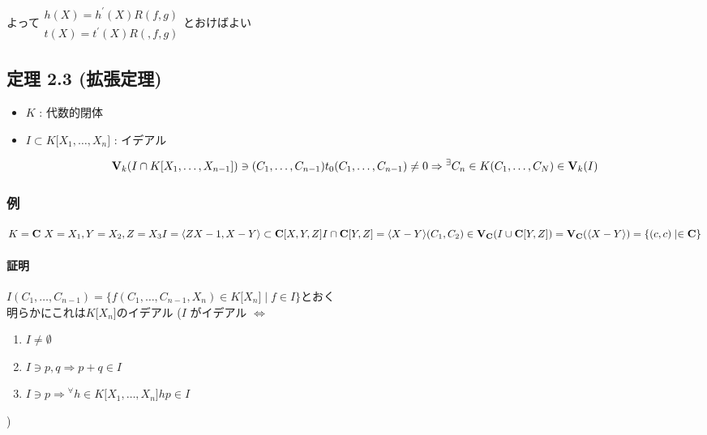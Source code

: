 \documentclass[12pt,a4paper]{article}
\begin{document}
  よって$ \begin{array}{l}h(X) = h^\prime (X) R(f, g) \\ t(X) = t^\prime (X) R(,f, g) \end{array}$とおけばよい

\subsection*{定理 2.3 (拡張定理)}
  \begin{itemize}
    \item $K$ : 代数的閉体
    \item $ I \subset{} K \lbrack{} X_1, \ldots, X_n \rbrack{} $ : イデアル
  \end{itemize}
  \[ \mathbf{V}_k (I \cap K \lbrack X_1, \ldots, X_{n-1} \rbrack ) \ni ( C_1, \ldots , C_{n-1} )  \\
  t_0 (C_1, \ldots , C_{n-1} )\neq 0 \Rightarrow {}^\exists C_n \in K (C_1, \ldots , C_N) \in \mathbf{V}_k (I) \]

  \subsubsection*{例}
    $K = \mathbf{C} \ X = X_1, Y = X_2, Z = X_3 \\
      I = \langle ZX -1, X-Y \rangle \subset \mathbf C \lbrack X, Y, Z \rbrack \\
      I \cap \mathbf C \lbrack Y, Z \rbrack = \langle X - Y \rangle \\
    (C_1, C_2) \in \mathbf{V}_\mathbf{C} (I \cup \mathbf{C} \lbrack Y, Z \rbrack) = \mathbf{V}_\mathbf{C} (\langle X - Y \rangle) = \lbrace (c, c) \mid \in \mathbf{C} \rbrace $

    \paragraph{証明}
      $I ( C_1, \ldots , C_{n-1})  = \lbrace f(C_1, \ldots, C_{n-1}, X_n) \in K \lbrack X_n \rbrack \mid f \in I \rbrace$とおく \\
      明らかにこれは$K \lbrack X_n \rbrack$のイデアル 
      ($I$ がイデアル $\Leftrightarrow $
        \begin{enumerate}
          \item $I \neq \emptyset$
          \item $I \ni p, q \Rightarrow p + q \in I$
          \item $I \ni p \Rightarrow{} {}^\forall h \in K\lbrack X_1, \ldots, X_n \rbrack hp \in I$
        \end{enumerate})
\end{document}
